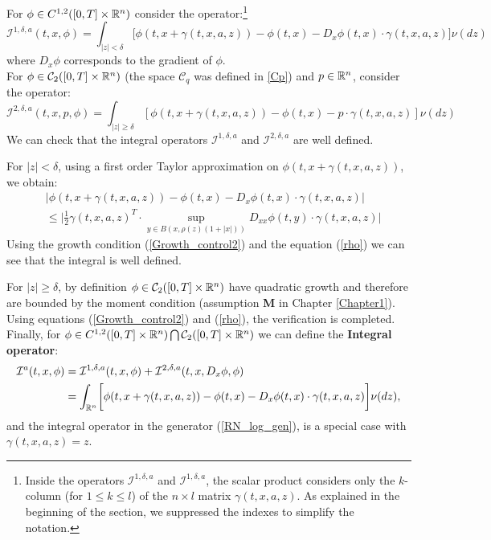 For $\phi \in C^{1,2}([0,T] \times \mathbb{R}^n) $ consider the operator:\footnote{Inside the operators $\mathcal{I}^{1,\delta,a}$ and $\mathcal{I}^{1,\delta,a}$, 
the scalar product considers only the $k$-column (for $1\leq k \leq l$) of the $n\times l$ matrix $\gamma(t,x,a,z)$. As explained in the beginning of the section, 
we suppressed the indexes to simplify the notation. }
\begin{equation}
 \mathcal{I}^{1,\delta,a}(t,x,\phi) = \int_{|z|<\delta}
\biggl[ \phi(t,x + \gamma(t,x,a,z)) - \phi(t,x) - D_x \phi(t,x) \cdot \gamma(t,x,a,z) \biggr] \nu(dz)
\end{equation}
where $D_x \phi$ corresponds to the gradient of $\phi$.\\
For $\phi \in \mathcal{C}_2([0,T] \times \mathbb{R}^n) $ (the space $\mathcal{C}_q$ was defined in \ref{Cp}) and $p \in \mathbb{R}^n$, consider the operator:
\begin{equation}
\mathcal{I}^{2,\delta,a}(t,x,p,\phi) = \int_{|z|\geq \delta}
[ \phi(t,x+ \gamma(t,x,a,z)) - \phi(t,x) - p \cdot \gamma(t,x,a,z)] \nu(dz)
\end{equation}
We can check that the integral operators $\mathcal{I}^{1,\delta,a}$ and $\mathcal{I}^{2,\delta,a}$ are well defined.

For $|z|<\delta$, using a first order Taylor approximation on $\phi(t,x + \gamma(t,x,a,z))$, we obtain:
\begin{align*}
 & \bigg|\phi(t,x + \gamma(t,x,a,z)) - \phi(t,x) - D_x \phi(t,x) \cdot \gamma(t,x,a,z) \bigg| \\ 
 & \leq \bigg| \frac{1}{2} \gamma(t,x,a,z)^T \cdot \sup_{y \in B(x,\rho(z)(1+|x|) )}  D_{xx} \phi(t,y) \cdot \gamma(t,x,a,z) \bigg| 
\end{align*}
Using the growth condition (\ref{Growth_control2}) and the equation (\ref{rho}) we can see that the integral is well defined.

For $|z|\geq \delta$, by definition $\phi \in \mathcal{C}_2([0,T] \times \mathbb{R}^n) $ have quadratic growth and therefore are bounded by 
the moment condition (assumption \textbf{M} 
in Chapter \ref{Chapter1}). Using equations (\ref{Growth_control2}) and (\ref{rho}), the verification is completed.\\

\noindent
Finally, for $\phi \in C^{1,2}([0,T] \times \mathbb{R}^n) \bigcap \mathcal{C}_2([0,T] \times \mathbb{R}^n)$ we can define the 
\textbf{Integral operator}:
\begin{align}\label{int_oper}
 \mathcal{I}^{a}(t,x,\phi) &= \mathcal{I}^{1,\delta,a}(t,x,\phi) + \mathcal{I}^{2,\delta,a}(t,x,D_x \phi,\phi)\\ \nonumber
 &= \int_{\mathbb{R}^n}
\biggl[ \phi(t,x + \gamma(t,x,a,z)) - \phi(t,x) - D_x \phi(t,x) \cdot \gamma(t,x,a,z) \biggr] \nu(dz), 
\end{align}
and the integral operator in the generator (\ref{RN_log_gen}), is a special case with $\gamma(t,x,a,z) = z$.


